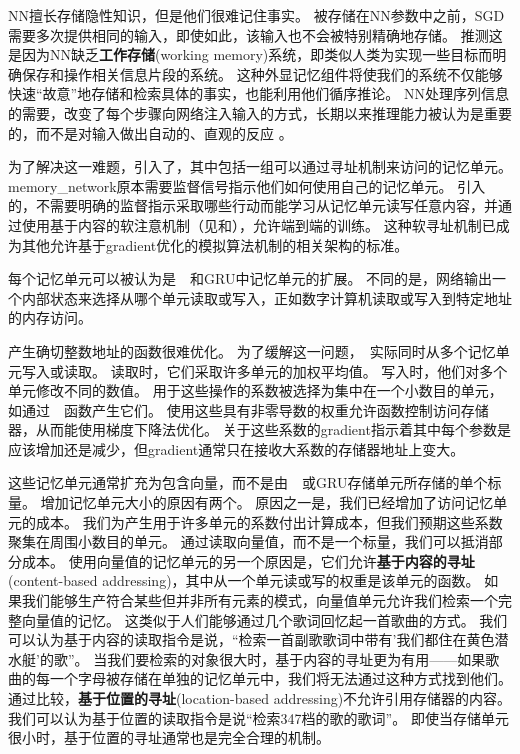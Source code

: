 \gls{NN}擅长存储隐性知识，但是他们很难记住事实。
被存储在\gls{NN}参数中之前，\gls{SGD}需要多次提供相同的输入，即使如此，该输入也不会被特别精确地存储。
\citet{Graves-et-al-arxiv2014}推测这是因为\gls{NN}缺乏\textbf{工作存储}(working memory)系统，即类似人类为实现一些目标而明确保存和操作相关信息片段的系统。
这种外显记忆组件将使我们的系统不仅能够快速``故意''地存储和检索具体的事实，也能利用他们循序推论。
\gls{NN}处理序列信息的需要，改变了每个步骤向网络注入输入的方式，长期以来推理能力被认为是重要的，而不是对输入做出自动的、直观的反应\citep{hinton1990mapping} 。


为了解决这一难题，\citep{Weston2014}引入了，其中包括一组可以通过寻址机制来访问的记忆单元。
\gls{memory_network}原本需要监督信号指示他们如何使用自己的记忆单元。
\citep{Graves-et-al-arxiv2014}引入的，不需要明确的监督指示采取哪些行动而能学习从记忆单元读写任意内容，并通过使用基于内容的软注意机制（见\citep{Bahdanau-et-al-ICLR2015-small}和），允许端到端的训练。
这种软寻址机制已成为其他允许基于\gls{gradient}优化的模拟算法机制的相关架构的标准\citep{Sukhbaatar2015,Joulin+Mikolov-2015,Kumar-et-al-2015,Vinyals2015,Grefenstette-et-al-NIPS2015}。

每个记忆单元可以被认为是~~和GRU中记忆单元的扩展。
不同的是，网络输出一个内部状态来选择从哪个单元读取或写入，正如数字计算机读取或写入到特定地址的内存访问。


产生确切整数地址的函数很难优化。
为了缓解这一问题，~实际同时从多个记忆单元写入或读取。
读取时，它们采取许多单元的加权平均值。
写入时，他们对多个单元修改不同的数值。
用于这些操作的系数被选择为集中在一个小数目的单元，如通过~~函数产生它们。
使用这些具有非零导数的权重允许函数控制访问存储器，从而能使用梯度下降法优化。
关于这些系数的\gls{gradient}指示着其中每个参数是应该增加还是减少，但\gls{gradient}通常只在接收大系数的存储器地址上变大。

这些记忆单元通常扩充为包含向量，而不是由~~或GRU存储单元所存储的单个标量。
增加记忆单元大小的原因有两个。
原因之一是，我们已经增加了访问记忆单元的成本。
我们为产生用于许多单元的系数付出计算成本，但我们预期这些系数聚集在周围小数目的单元。
通过读取向量值，而不是一个标量，我们可以抵消部分成本。 
使用向量值的记忆单元的另一个原因是，它们允许\textbf{基于内容的寻址}(content-based addressing)，其中从一个单元读或写的权重是该单元的函数。
如果我们能够生产符合某些但并非所有元素的模式，向量值单元允许我们检索一个完整向量值的记忆。
这类似于人们能够通过几个歌词回忆起一首歌曲的方式。
我们可以认为基于内容的读取指令是说，``检索一首副歌歌词中带有'我们都住在黄色潜水艇'的歌''。
当我们要检索的对象很大时，基于内容的寻址更为有用——如果歌曲的每一个字母被存储在单独的记忆单元中，我们将无法通过这种方式找到他们。
通过比较，\textbf{基于位置的寻址}(location-based addressing)不允许引用存储器的内容。
我们可以认为基于位置的读取指令是说``检索347档的歌的歌词''。
即使当存储单元很小时，基于位置的寻址通常也是完全合理的机制。

